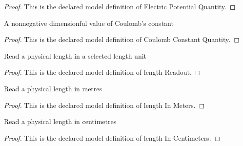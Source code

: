 \begin{proof}
  This is the declared model definition of Electric Potential Quantity.
\end{proof}
\begin{definition}
  \label{def:physics:phyx-mini-0867:phyxminiproblems-problemphyxmini0867-coulombconstantquantity}
  A nonnegative dimensionful value of Coulomb's constant
\end{definition}
\begin{proof}
  This is the declared model definition of Coulomb Constant Quantity.
\end{proof}
\begin{definition}
  \label{def:physics:phyx-mini-0867:phyxminiproblems-problemphyxmini0867-lengthreadout}
  Read a physical length in a selected length unit
\end{definition}
\begin{proof}
  This is the declared model definition of length Readout.
\end{proof}
\begin{definition}
  \label{def:physics:phyx-mini-0867:phyxminiproblems-problemphyxmini0867-lengthinmeters}
  Read a physical length in metres
\end{definition}
\begin{proof}
  This is the declared model definition of length In Meters.
\end{proof}
\begin{definition}
  \label{def:physics:phyx-mini-0867:phyxminiproblems-problemphyxmini0867-lengthincentimeters}
  Read a physical length in centimetres
\end{definition}
\begin{proof}
  This is the declared model definition of length In Centimeters.
\end{proof}
